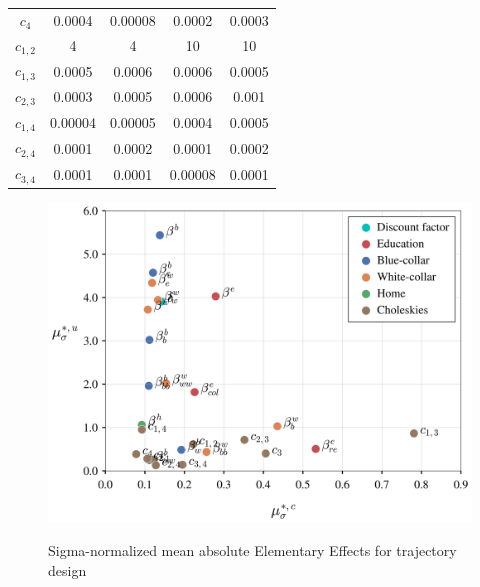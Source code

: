 \documentclass[a4paper,12pt]{article}
\begin{document}
\begin{table}[H]
\begin{threeparttable}
\begin{tabular}{cS[table-format=3.2]S[table-format=3.2]@{\hskip 0.7in}|@{\hskip 0.5in}S[table-format=3.2]S[table-format=3.2]}
			$c_{4}$      & 0.0004    & 0.00008              & 0.0002 & 0.0003    \\
			$c_{1,2}$     & 4   & 4            & 10 &  10  \\
			$c_{1,3}$      & 0.0005   & 0.0006              & 0.0006 &  0.0005   \\
			$c_{2,3}$      & 0.0003    & 0.0005             &  0.0006 &   0.001 \\
			$c_{1,4}$      & 0.00004    & 0.00005            &   0.0004 &  0.0005 \\
			$c_{2,4}$      & 0.0001    & 0.0002           & 0.0001  &  0.0002  \\
			$c_{3,4}$      & 0.0001   & 0.0001                & 0.00008  &  0.0001   \\ \bottomrule
		\end{tabular}
	\end{threeparttable}
\end{table}
\newpage
\begin{figure}[H]
	\caption{Sigma-normalized mean absolute Elementary Effects for trajectory design}
	\centering
	\includegraphics[scale=0.52]{../../../scrypy/figures/scatter_traj}
	\label{fig:traj}
\end{figure}
\end{document}
